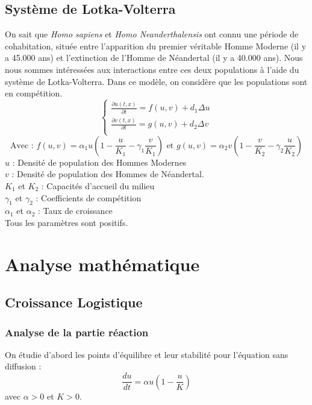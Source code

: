 \documentclass[a4paper,11pt]{article}
\begin{document}
\subsection{Système de Lotka-Volterra}
On sait que \textit{Homo sapiens} et \textit{Homo Neanderthalensis} ont connu une période de cohabitation, située entre l'apparition du premier véritable Homme Moderne (il y a 45.000 ans) et l'extinction de l'Homme de Néandertal (il y a 40.000 ans). Nous nous sommes intéressées aux interactions entre ces deux populations à l'aide du système de Lotka-Volterra. Dans ce modèle, on considère que les populations sont en compétition.\\
$$\begin{cases} \frac{\partial u(t,x)}{\partial t} = f(u,v) + d_1\Delta u\\ \frac{\partial v(t,x)}{\partial t} = g(u,v) + d_2 \Delta v \\ 
\end{cases}$$
$$\text{Avec : } f(u,v) = \alpha_1 u\left(1-\frac{u}{K_1}-\gamma_1\frac{v}{K_1}\right) \text{ et } g(u,v) = \alpha_2 v\left(1-\frac{v}{K_2}-\gamma_2\frac{u}{K_2}\right)$$
$u$ : Densité de population des Hommes Modernes \\
$v$ : Densité de population des Hommes de Néandertal.\\
$K_1$ et $K_2$ : Capacités d'accueil du milieu\\
$\gamma_1$ et $\gamma_2$ : Coefficients de compétition\\
$\alpha_1$ et $\alpha_2$ : Taux de croissance\\

\noindent Tous les paramètres sont positifs.

\section{Analyse mathématique}
\subsection{Croissance Logistique}
\subsubsection{Analyse de la partie réaction}

On étudie d'abord les points d'équilibre et leur stabilité pour l'équation sans diffusion : $$\frac{du}{dt}=\alpha u (1- \dfrac{u}{K})$$
avec $\alpha>0$ et $K>0$.
\newline
\end{document}

